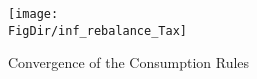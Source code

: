 \hypertarget{inf_rebalance_Tax}{}
\begin{figure}[tbp]
\centerline{\texttt{[image: \\FigDir/inf\_rebalance\_Tax]}}
\caption{Convergence of the Consumption Rules}
\label{fig:inf_rebalance_Tax}
\end{figure}
